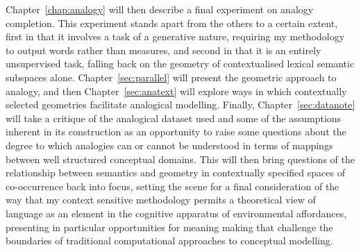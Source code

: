 Chapter~\ref{chap:analogy} will then describe a final experiment on analogy completion.  This experiment stands apart from the others to a certain extent, first in that it involves a task of a generative nature, requiring my methodology to output words rather than measures, and second in that it is an entirely unsupervised task, falling back on the geometry of contextualised lexical semantic subspaces alone.  Chapter~\ref{sec:parallel} will present the geometric approach to analogy, and then Chapter~\ref{sec:anatext} will explore ways in which contextually selected geometries facilitate analogical modelling.  Finally, Chapter~\ref{sec:datanote} will take a critique of the analogical dataset used and some of the assumptions inherent in its construction as an opportunity to raise some questions about the degree to which analogies can or cannot be understood in terms of mappings between well structured conceptual domains.  This will then bring questions of the relationship between semantics and geometry in contextually specified spaces of co-occurrence back into focus, setting the scene for a final consideration of the way that my context sensitive methodology permits a theoretical view of language as an element in the cognitive apparatus of environmental affordances, presenting in particular opportunities for meaning making that challenge the boundaries of traditional computational approaches to conceptual modelling.

